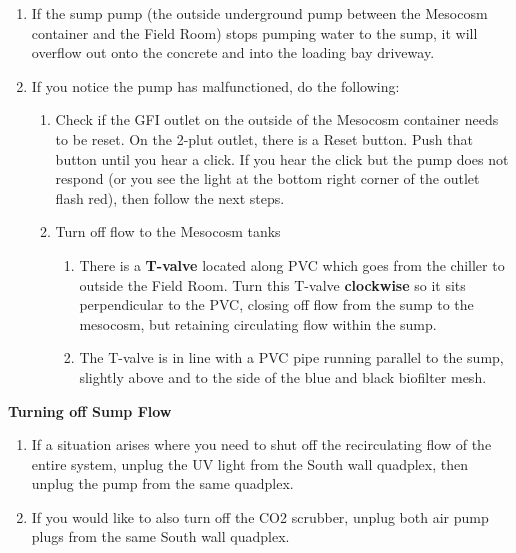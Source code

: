 \documentclass[
]{book}
\providecommand{\tightlist}{%
  \setlength{\itemsep}{0pt}\setlength{\parskip}{0pt}}
\begin{document}
\begin{enumerate}
\def\labelenumi{\arabic{enumi}.}
\tightlist
\item
  If the sump pump (the outside underground pump between the Mesocosm container and the Field Room) stops pumping water to the sump, it will overflow out onto the concrete and into the loading bay driveway.
\item
  If you notice the pump has malfunctioned, do the following:

  \begin{enumerate}
  \def\labelenumii{\arabic{enumii}.}
  \tightlist
  \item
    Check if the GFI outlet on the outside of the Mesocosm container needs to be reset. On the 2-plut outlet, there is a Reset button. Push that button until you hear a click. If you hear the click but the pump does not respond (or you see the light at the bottom right corner of the outlet flash red), then follow the next steps.
  \item
    Turn off flow to the Mesocosm tanks

    \begin{enumerate}
    \def\labelenumiii{\arabic{enumiii}.}
    \tightlist
    \item
      There is a \textbf{T-valve} located along PVC which goes from the chiller to outside the Field Room. Turn this T-valve \textbf{clockwise} so it sits perpendicular to the PVC, closing off flow from the sump to the mesocosm, but retaining circulating flow within the sump.
    \item
      The T-valve is in line with a PVC pipe running parallel to the sump, slightly above and to the side of the blue and black biofilter mesh.
    \end{enumerate}
  \end{enumerate}
\end{enumerate}

\textbf{Turning off Sump Flow}

\begin{enumerate}
\def\labelenumi{\arabic{enumi}.}
\tightlist
\item
  If a situation arises where you need to shut off the recirculating flow of the entire system, unplug the UV light from the South wall quadplex, then unplug the pump from the same quadplex.
\item
  If you would like to also turn off the CO2 scrubber, unplug both air pump plugs from the same South wall quadplex.
\end{enumerate}
\end{document}
